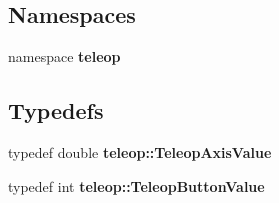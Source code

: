 \subsection*{Namespaces}
\begin{DoxyCompactItemize}
\item 
namespace {\bf teleop}
\end{DoxyCompactItemize}
\subsection*{Typedefs}
\begin{DoxyCompactItemize}
\item 
typedef double {\bf teleop::TeleopAxisValue}
\item 
typedef int {\bf teleop::TeleopButtonValue}
\end{DoxyCompactItemize}
